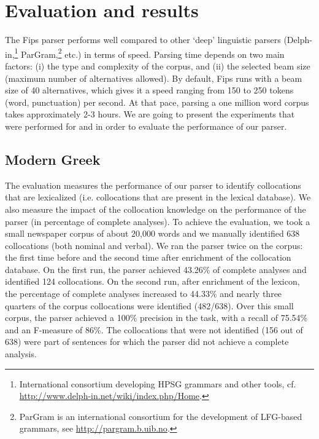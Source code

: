 \documentclass[output=paper]{langsci/langscibook}
\begin{document}
\section{Evaluation and results}
\label{fou:sec6}
The Fips parser performs well compared to other `deep' linguistic parsers (Delph-in,\footnote{International consortium developing HPSG grammars and other tools, cf. \url{http://www.delph-in.net/wiki/index.php/Home}.} ParGram,\footnote{ParGram is an international consortium for the development of LFG-based grammars, see \url{http://pargram.b.uib.no}.} etc.) in terms of speed. Parsing time depends on two main factors: (i) the type and complexity of the corpus, and (ii) the selected beam size (maximum number of alternatives allowed). By default, Fips runs with a beam size of 40 alternatives, which gives it a speed ranging from 150 to 250 tokens (word, punctuation) per second. At that pace, parsing a one million word corpus takes approximately 2-3 hours. We are going to present the experiments that were performed for  and  in order to evaluate the performance of our parser. 

\subsection{Modern Greek}
The evaluation measures the performance of our parser to identify collocations that are lexicalized (i.e. collocations that are present in the lexical database). We also measure the impact of the collocation knowledge on the performance of the parser (in percentage of complete analyses). To achieve the evaluation, we took a small newspaper corpus of about 20,000 words  and we manually identified 638 collocations (both nominal and verbal). We ran the parser twice on the corpus: the first time before and the second time after enrichment of the collocation database. 
On the first run, the parser achieved 43.26\% of complete analyses and identified 124 collocations. On the second run, after enrichment of the lexicon, the percentage of complete analyses increased to 44.33\% and nearly three quarters of the corpus collocations were identified (482/638). Over this small corpus, the parser achieved a 100\% precision in the  task, with a recall of 75.54\% and an F-measure of 86\%. The collocations that were not identified (156 out of 638) were part of sentences for which the parser did not achieve a complete analysis.
	
\end{document}
